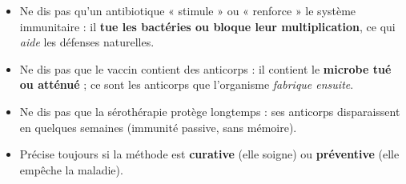 \documentclass[11pt]{article}
\begin{document}
\begin{attention}
\begin{itemize}
\item Ne dis pas qu'un antibiotique « stimule » ou « renforce » le système immunitaire : il \textbf{tue les bactéries ou bloque leur multiplication}, ce qui \emph{aide} les défenses naturelles.
\item Ne dis pas que le vaccin contient des anticorps : il contient le \textbf{microbe tué ou atténué} ; ce sont les anticorps que l'organisme \emph{fabrique ensuite}.
\item Ne dis pas que la sérothérapie protège longtemps : ses anticorps disparaissent en quelques semaines (immunité passive, sans mémoire).
\item Précise toujours si la méthode est \textbf{curative} (elle soigne) ou \textbf{préventive} (elle empêche la maladie).
\end{itemize}
\end{attention}
\end{document}
